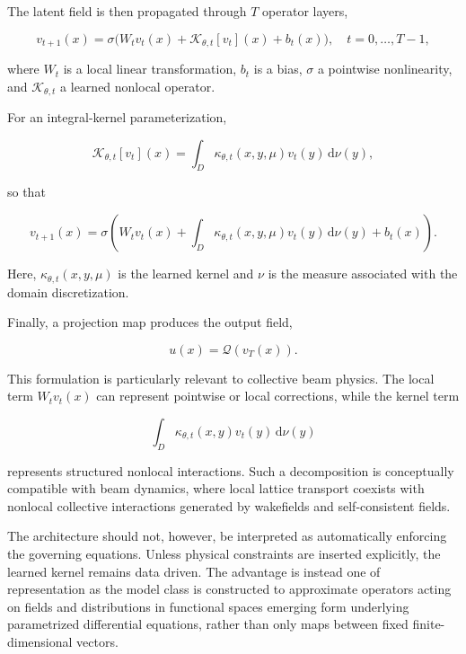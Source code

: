 The latent field is then propagated through \(T\) operator layers\cite{arpaia2021machine},

\begin{equation}
\label{eq:81}
v_{t+1}(x)=\sigma\bigl(W_tv_t(x)+\mathcal K_{\theta,t}[v_t](x)+b_t(x)\bigr),\quad t=0,\ldots,T-1,
\end{equation}

where \(W_{t}\) is a local linear transformation, \(b_{t}\) is a bias, \(\sigma\) a pointwise nonlinearity, and \(\mathcal{K}_{\theta , t}\) a learned nonlocal operator.

For an integral-kernel parameterization,

\begin{equation}
\label{eq:82}
\mathcal K_{\theta,t}[v_t](x)=\int_D\kappa_{\theta,t}(x,y,\mu)v_t(y)\,\mathrm d\nu(y),
\end{equation}

so that

\begin{equation}
\label{eq:83}
v_{t+1}(x)=\sigma\left(W_tv_t(x)+\int_D\kappa_{\theta,t}(x,y,\mu)v_t(y)\,\mathrm d\nu(y)+b_t(x)\right).
\end{equation}

Here, \(\kappa_{\theta , t} ( x , y , \mu )\) is the learned kernel and \(\nu\) is the measure associated with the domain discretization.

Finally, a projection map produces the output field,

\begin{equation}
\label{eq:84}
u(x)=\mathcal Q(v_T(x)).
\end{equation}

This formulation is particularly relevant to collective beam physics. The local term \(W_{t} v_{t} ( x )\) can represent pointwise or local corrections, while the kernel term

\begin{equation}
\label{eq:85}
\int_D\kappa_{\theta,t}(x,y)v_t(y)\,\mathrm d\nu(y)
\end{equation}

represents structured nonlocal interactions. Such a decomposition is conceptually compatible with beam dynamics, where local lattice transport coexists with nonlocal collective interactions generated by wakefields and self-consistent fields.

The architecture should not, however, be interpreted as automatically enforcing the governing equations. Unless physical constraints are inserted explicitly, the learned kernel remains data driven. The advantage is instead one of representation as the model class is constructed to approximate operators acting on fields and distributions in functional spaces emerging form underlying parametrized differential equations, rather than only maps between fixed finite-dimensional vectors.

